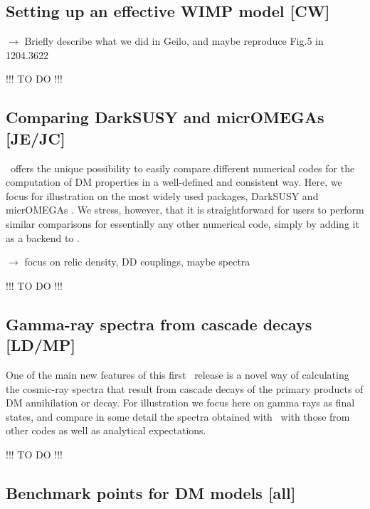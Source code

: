 \subsection{Setting up an effective WIMP model {\bf [CW]}}

$\to$ Briefly describe what we did in Geilo, and maybe reproduce Fig.5 in 1204.3622

\smallskip
{\color{red} !!! TO DO !!!}
\smallskip


\subsection{Comparing {\sf DarkSUSY} and {\sf micrOMEGAs} {\bf [JE/JC]}}

\DB\ offers the unique possibility to easily compare different numerical codes for the computation of DM properties
in a well-defined and consistent way. Here, we focus for illustration on the most widely used packages, {\sf DarkSUSY} 
\cite{xxx} and {\sf micrOMEGAs} \cite{xxx}. We stress, however, that it is straightforward for users to 
perform similar comparisons for essentially any other numerical code, simply by adding it as a backend to \DB.

\medskip
$\to$ focus on relic density, DD couplings, maybe spectra

\smallskip
{\color{red} !!! TO DO !!!}
\smallskip



\subsection{Gamma-ray spectra from cascade decays {\bf [LD/MP]}}

One of the main new features of this first \DB\ release is a novel way of calculating the cosmic-ray spectra that result from 
cascade decays of the primary products of DM annihilation or decay. For illustration we focus here on gamma
rays as final states, and compare in some detail the spectra obtained with \DB\ with those from other codes
as well as analytical expectations.

\smallskip
{\color{red} !!! TO DO !!!}
\smallskip



\subsection{Benchmark points for DM models {\bf [all]}}

